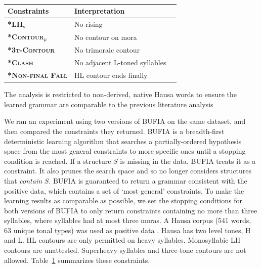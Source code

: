 \documentclass[11pt]{article}
\begin{document}
\begin{table}
  \centering
  \begin{tabular}{lll}
                \hline
                \textbf{Constraints}& \textbf{Interpretation}\\
                \hline
                \textbf{\textsc{*LH}$_\sigma$}    & No rising \\
                \textbf{\textsc{*Contour}$_{\mu}$} & No contour on mora\\
                \textbf{\textsc{*3t-Contour}}& No trimoraic contour\\
                \textbf{\textsc{*Clash}}& No adjacent L-toned syllables\\
                \textbf{\textsc{*Non-final Fall}}& HL contour ends finally\\
                \hline
        \end{tabular}
        \vspace{-0.5em}\caption{}
        \vspace{-1.5em}
        \label{rules}
\end{table}
The analysis is restricted to non-derived, native Hausa words to ensure the learned grammar are comparable to the previous literature analysis

 We ran an experiment using two versions of BUFIA \citep{chandleeLearningPartiallyOrdered2019} on the same dataset, and then compared the constraints they returned. BUFIA is a breadth-first deterministic learning algorithm that searches a partially-ordered hypothesis space from the most general constraints to more specific
ones until a stopping condition is reached. If a structure $S$ is missing in the data, BUFIA treats it as a constraint. It also prunes the search space and so no longer considers structures that \textit{contain} $S$. BUFIA is guaranteed to return a grammar consistent with the positive data, which contains a set of `most general' constraints. To make the learning results as comparable as possible, we set the stopping conditions for both versions of BUFIA to only return constraints containing no more than three syllables, where syllables had at most three moras.
A Hausa corpus (541 words, 63 unique tonal types) was used as positive data \citep{wold-4, liLearningTonotactic2025}. Hausa has two level tones, H and L. HL contours are only permitted on heavy syllables. Monosyllabic LH contours are unattested. Superheavy syllables and three-tone contours are not allowed. Table~\ref{rules} summarizes these constraints.
\end{document}
